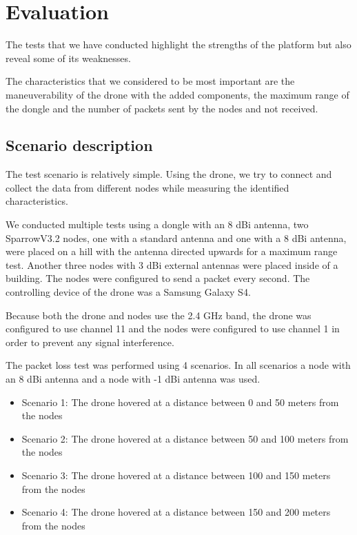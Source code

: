 \normalfont\normalsize
\chapter{Evaluation}

The tests that we have conducted highlight the strengths of the platform but also reveal some of its weaknesses.

The characteristics that we considered to be most important are the maneuverability of the drone with the added components, the maximum range of the dongle and the number of packets sent by the nodes and not received.
 

\section{Scenario description}

The test scenario is relatively simple. Using the drone, we try to connect and collect the data from different nodes while measuring the identified characteristics.

We conducted multiple tests using a dongle with an 8 dBi antenna, two SparrowV3.2 nodes, one with a standard antenna and one with a 8 dBi antenna, were placed on a hill with the antenna directed upwards for a maximum range test. Another three nodes with 3 dBi external antennas were placed inside of a building. The nodes were configured to send a packet every second. The controlling device of the drone was a Samsung Galaxy S4.

Because both the drone and nodes use the 2.4 GHz band, the drone was configured to use channel 11 and the nodes were configured to use channel 1 in order to prevent any signal interference.

The packet loss test was performed using 4 scenarios. In all scenarios a node with an 8 dBi antenna and a node with -1 dBi antenna was used. 
 
\begin{itemize}

\item Scenario 1: The drone hovered at a distance between 0 and 50 meters from the nodes
\item Scenario 2: The drone hovered at a distance between 50 and 100 meters from the nodes
\item Scenario 3: The drone hovered at a distance between 100 and 150 meters from the nodes
\item Scenario 4: The drone hovered at a distance between 150 and 200 meters from the nodes

\end{itemize}



